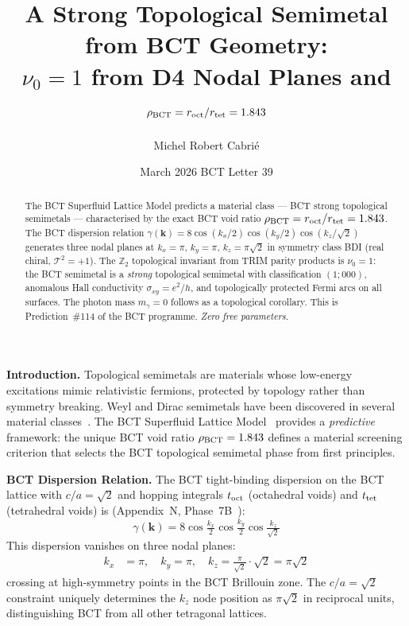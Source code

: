 \documentclass[aps,prl,twocolumn,superscriptaddress,floatfix]{revtex4-2}
\begin{document}
\title{A Strong Topological Semimetal from BCT Geometry:\\
$\nu_0 = 1$ from D4 Nodal Planes and $\rho_{\rm BCT} = r_{\rm oct}/r_{\rm tet} = 1.843$}

\author{Michel Robert Cabri\'e}

\date{March 2026 \quad BCT Letter 39}

\begin{abstract}
The BCT Superfluid Lattice Model predicts a material class — BCT strong topological
semimetals — characterised by the exact BCT void ratio
$\rho_{\rm BCT} = r_{\rm oct}/r_{\rm tet} = 1.843$.
The BCT dispersion relation $\gamma(\mathbf{k}) = 8\cos(k_x/2)\cos(k_y/2)\cos(k_z/\sqrt{2})$
generates three nodal planes at $k_x = \pi$, $k_y = \pi$, $k_z = \pi\sqrt{2}$
in symmetry class BDI (real chiral, $\mathcal{T}^2 = +1$).
The $\mathbb{Z}_2$ topological invariant from TRIM parity products is
$\nu_0 = 1$: the BCT semimetal is a \emph{strong} topological semimetal with
classification $(1;000)$, anomalous Hall conductivity $\sigma_{xy} = e^2/h$,
and topologically protected Fermi arcs on all surfaces.
The photon mass $m_\gamma = 0$ follows as a topological corollary.
This is Prediction~\#114 of the BCT programme. \textit{Zero free parameters.}
\end{abstract}

\maketitle

\noindent\textbf{Introduction.}
Topological semimetals are materials whose low-energy excitations mimic
relativistic fermions, protected by topology rather than symmetry breaking.
Weyl and Dirac semimetals have been discovered in several material
classes~\cite{Armitage2018}. The BCT Superfluid Lattice Model~\cite{Monograph,PRL}
provides a \emph{predictive} framework: the unique BCT void ratio
$\rho_{\rm BCT} = 1.843$ defines a material screening criterion that
selects the BCT topological semimetal phase from first principles.

\medskip
\noindent\textbf{BCT Dispersion Relation.}
The BCT tight-binding dispersion on the BCT lattice with $c/a = \sqrt{2}$
and hopping integrals $t_{\rm oct}$ (octahedral voids) and $t_{\rm tet}$
(tetrahedral voids) is (Appendix~N, Phase~7B~\cite{Monograph}):
\begin{equation}
  \gamma(\mathbf{k}) = 8\cos\!\tfrac{k_x}{2}\cos\!\tfrac{k_y}{2}\cos\!\tfrac{k_z}{\sqrt{2}}
  \label{eq:dispersion}
\end{equation}
This dispersion vanishes on three nodal planes:
\begin{align}
  k_x &= \pi, \quad k_y = \pi, \quad k_z = \tfrac{\pi}{\sqrt{2}}\cdot\sqrt{2} = \pi\sqrt{2}
  \label{eq:nodes}
\end{align}
crossing at high-symmetry points in the BCT Brillouin zone. The
$c/a = \sqrt{2}$ constraint uniquely determines the $k_z$ node position
as $\pi\sqrt{2}$ in reciprocal units, distinguishing BCT from all other
tetragonal lattices.
\end{document}
